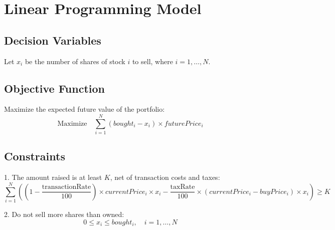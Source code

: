 \documentclass{article}
\begin{document}
\section*{Linear Programming Model}

\subsection*{Decision Variables}
Let \( x_i \) be the number of shares of stock \( i \) to sell, where \( i = 1, \ldots, N \).

\subsection*{Objective Function}
Maximize the expected future value of the portfolio:
\[
\text{Maximize} \quad \sum_{i=1}^{N} (bought_i - x_i) \times futurePrice_i
\]

\subsection*{Constraints}
1. The amount raised is at least \( K \), net of transaction costs and taxes:
\[
\sum_{i=1}^{N} \left( (1 - \frac{\text{transactionRate}}{100}) \times currentPrice_i \times x_i - \frac{\text{taxRate}}{100} \times (currentPrice_i - buyPrice_i) \times x_i \right) \geq K
\]

2. Do not sell more shares than owned:
\[
0 \leq x_i \leq bought_i, \quad i = 1, \ldots, N
\]
\end{document}
